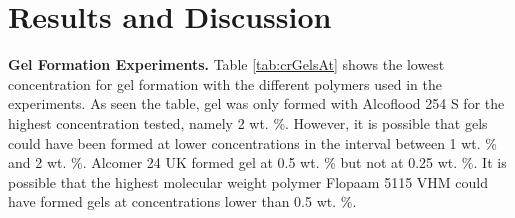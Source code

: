 \documentclass[journal = enfuem, manuscript =  article]{achemso}
\begin{document}



\section{Results and Discussion}
\textbf{Gel Formation Experiments.} Table \ref{tab:crGelsAt} shows the lowest concentration for gel formation with the different polymers used in the experiments. As seen the table, gel was only formed with Alcoflood 254 S for the highest concentration tested, namely 2 wt. \%. However, it is possible that gels could have been formed at lower concentrations in the interval between 1 wt. \% and 2 wt. \%. Alcomer 24 UK formed gel at 0.5 wt. \% but not at 0.25 wt. \%. It is possible that the highest molecular weight polymer Flopaam 5115 VHM could have formed gels at concentrations lower than 0.5 wt. \%.
\end{document}
